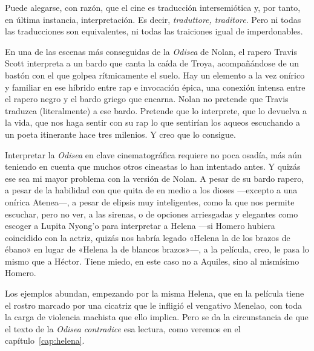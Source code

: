 Puede alegarse, con razón, que el cine es traducción intersemiótica y, por tanto, en última instancia, interpretación. Es decir, \emph{traduttore, traditore}. Pero ni todas las traducciones son equivalentes, ni todas las traiciones igual de imperdonables.

En una de las escenas más conseguidas de la \emph{Odisea} de Nolan, el rapero Travis Scott interpreta a un bardo que canta la caída de Troya, acompañándose de un bastón con el que golpea rítmicamente el suelo. Hay un elemento a la vez onírico y familiar en ese híbrido entre rap e invocación épica, una conexión intensa entre el rapero negro y el bardo griego que encarna. Nolan no pretende que Travis traduzca (literalmente) a ese bardo. Pretende que lo interprete, que lo devuelva a la vida, que nos haga sentir con su rap lo que sentirían los aqueos escuchando a un poeta itinerante hace tres milenios. Y creo que lo consigue.

Interpretar la \emph{Odisea} en clave cinematográfica requiere no poca osadía, más aún teniendo en cuenta que muchos otros cineastas lo han intentado antes. Y quizás ese sea mi mayor problema con la versión de Nolan. A pesar de su bardo rapero, a pesar de la habilidad con que quita de en medio a los dioses ---excepto a una onírica Atenea---, a pesar de elipsis muy inteligentes, como la que nos permite escuchar, pero no ver, a las sirenas, o de opciones arriesgadas y elegantes como escoger a Lupita Nyong'o para interpretar a Helena ---si Homero hubiera coincidido con la actriz, quizás nos habría legado «Helena la de los brazos de ébano» en lugar de «Helena la de blancos brazos»---, a la película, creo, le pasa lo mismo que a Héctor. Tiene miedo, en este caso no a Aquiles, sino al mismísimo Homero.

Los ejemplos abundan, empezando por la misma Helena, que en la película tiene el rostro marcado por una cicatriz que le infligió el vengativo Menelao, con toda la carga de violencia machista que ello implica. Pero se da la circunstancia de que el texto de la \emph{Odisea} \emph{contradice} esa lectura, como veremos en el capítulo~\ref{cap:helena}.

